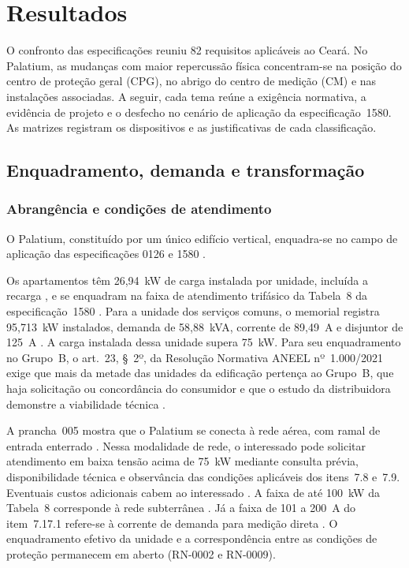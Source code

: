 \chapter{Resultados}
\label{cap:resultados}

O confronto das especificações reuniu 82 requisitos aplicáveis ao Ceará. No Palatium, as mudanças com maior repercussão física concentram-se na posição do centro de proteção geral (CPG), no abrigo do centro de medição (CM) e nas instalações associadas. A seguir, cada tema reúne a exigência normativa, a evidência de projeto e o desfecho no cenário de aplicação da especificação~1580. As matrizes registram os dispositivos e as justificativas de cada classificação.

\section{Enquadramento, demanda e transformação}

\subsection{Abrangência e condições de atendimento}

O Palatium, constituído por um único edifício vertical, enquadra-se no campo de aplicação das especificações 0126 e 1580 \cite[seção~1]{enel0126}\cite[seção~1 e item~7.8.1]{enel1580}.

Os apartamentos têm 26,94~kW de carga instalada por unidade, incluída a recarga \cite[p.~13]{palatiummemorial2025}, e se enquadram na faixa de atendimento trifásico da Tabela~8 da especificação~1580 \cite[tabela~8]{enel1580}. Para a unidade dos serviços comuns, o memorial registra 95,713~kW instalados, demanda de 58,88~kVA, corrente de 89,49~A e disjuntor de 125~A \cite[p.~6--9]{palatiummemorial2025}. A carga instalada dessa unidade supera 75~kW. Para seu enquadramento no Grupo~B, o art.~23, §~2º, da Resolução Normativa ANEEL nº~1.000/2021 exige que mais da metade das unidades da edificação pertença ao Grupo~B, que haja solicitação ou concordância do consumidor e que o estudo da distribuidora demonstre a viabilidade técnica \cite[art.~23, §~2º]{aneel1000}.

A prancha~005 mostra que o Palatium se conecta à rede aérea, com ramal de entrada enterrado \cite[prancha~005]{palatiumpranchas2025}. Nessa modalidade de rede, o interessado pode solicitar atendimento em baixa tensão acima de 75~kW mediante consulta prévia, disponibilidade técnica e observância das condições aplicáveis dos itens~7.8 e~7.9. Eventuais custos adicionais cabem ao interessado \cite[p.~33]{enel1580}. A faixa de até 100~kW da Tabela~8 corresponde à rede subterrânea \cite[tabela~8]{enel1580}. Já a faixa de 101 a 200~A do item~7.17.1 refere-se à corrente de demanda para medição direta \cite[item~7.17.1]{enel1580}. O enquadramento efetivo da unidade e a correspondência entre as condições de proteção permanecem em aberto (RN-0002 e RN-0009).

